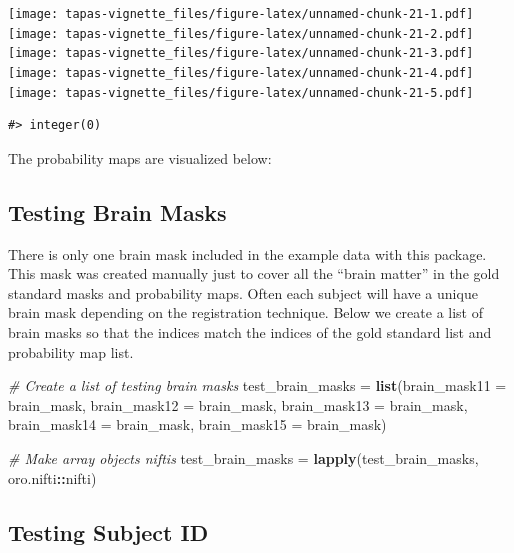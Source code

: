 \documentclass[]{article}
\newenvironment{Shaded}{\begin{snugshade}}{\end{snugshade}}
\newcommand{\CommentTok}[1]{\textcolor[rgb]{0.56,0.35,0.01}{\textit{#1}}}
\newcommand{\DataTypeTok}[1]{\textcolor[rgb]{0.13,0.29,0.53}{#1}}
\newcommand{\KeywordTok}[1]{\textcolor[rgb]{0.13,0.29,0.53}{\textbf{#1}}}
\newcommand{\NormalTok}[1]{#1}
\newcommand{\OperatorTok}[1]{\textcolor[rgb]{0.81,0.36,0.00}{\textbf{#1}}}
\newcommand{\StringTok}[1]{\textcolor[rgb]{0.31,0.60,0.02}{#1}}
\begin{document}
\texttt{[image: tapas-vignette\_files/figure-latex/unnamed-chunk-21-1.pdf]}
\texttt{[image: tapas-vignette\_files/figure-latex/unnamed-chunk-21-2.pdf]}
\texttt{[image: tapas-vignette\_files/figure-latex/unnamed-chunk-21-3.pdf]}
\texttt{[image: tapas-vignette\_files/figure-latex/unnamed-chunk-21-4.pdf]}
\texttt{[image: tapas-vignette\_files/figure-latex/unnamed-chunk-21-5.pdf]}

\begin{verbatim}
#> integer(0)
\end{verbatim}

The probability maps are visualized below:

\hypertarget{testing-brain-masks}{%
\subsection{Testing Brain Masks}\label{testing-brain-masks}}

There is only one brain mask included in the example data with this
package. This mask was created manually just to cover all the ``brain
matter'' in the gold standard masks and probability maps. Often each
subject will have a unique brain mask depending on the registration
technique. Below we create a list of brain masks so that the indices
match the indices of the gold standard list and probability map list.

\begin{Shaded}
\begin{Highlighting}[]
\CommentTok{# Create a list of testing brain masks}
\NormalTok{test_brain_masks =}\StringTok{ }\KeywordTok{list}\NormalTok{(}\DataTypeTok{brain_mask11 =}\NormalTok{ brain_mask, }
                        \DataTypeTok{brain_mask12 =}\NormalTok{ brain_mask,}
                        \DataTypeTok{brain_mask13 =}\NormalTok{ brain_mask,}
                        \DataTypeTok{brain_mask14 =}\NormalTok{ brain_mask,}
                        \DataTypeTok{brain_mask15 =}\NormalTok{ brain_mask)}

\CommentTok{# Make array objects niftis}
\NormalTok{test_brain_masks =}\StringTok{ }\KeywordTok{lapply}\NormalTok{(test_brain_masks, oro.nifti}\OperatorTok{::}\NormalTok{nifti)}
\end{Highlighting}
\end{Shaded}

\hypertarget{testing-subject-id}{%
\subsection{Testing Subject ID}\label{testing-subject-id}}
\end{document}
